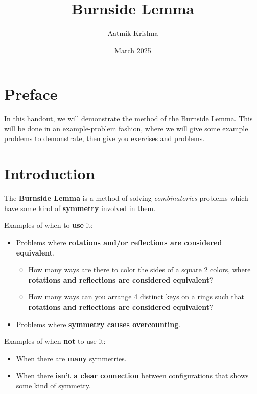 \documentclass[11pt]{scrartcl}
\title{Burnside Lemma}
\author{\LARGE Aatmik Krishna }
\date{\large March 2025}
\begin{document}
\maketitle

\section{Preface}
\large

In this handout, we will demonstrate the method of the Burnside Lemma. This will be done in an example-problem fashion, where we will give some example problems to demonstrate, then give you exercises and problems. 

\section{Introduction}

The \color{blue} \textbf{Burnside Lemma} \color{black} is a method of solving \textit{combinatorics} problems which have some kind of \textbf{symmetry} involved in them.

\begin{tcolorbox}[colback=orange!5!white,colframe=orange!75!black]
  Examples of when to \textbf{use} it:
  \begin{itemize}
  \item Problems where \color{blue} \textbf{rotations and/or reflections are considered equivalent}\color{black}.
  \begin{itemize}
      \item How many ways are there to color the sides of a square $2$ colors, where \textbf{rotations and reflections are considered equivalent}?
      \item How many ways can you arrange 4 distinct keys on a rings such that \textbf{rotations and reflections are considered equivalent}?
  \end{itemize}
  \item Problems where \color{blue} \textbf{symmetry causes overcounting}\color{black}.
  \end{itemize}
  Examples of when \textbf{not} to use it:
  \begin{itemize}
      \item When there are \textbf{many} symmetries.
      \item When there \textbf{isn't a clear connection} between configurations that shows some kind of symmetry.
  \end{itemize}
\end{tcolorbox}
\end{document}
